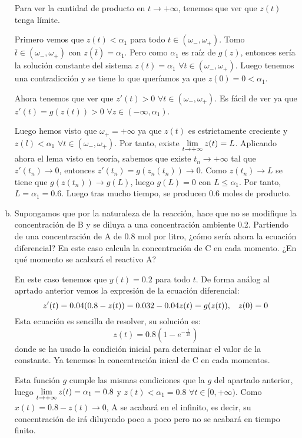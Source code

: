 \documentclass[12pt]{article}
\theoremstyle{definition}
\theoremstyle{remark}
\begin{document}
\begin{enumerate}[(a)]
Para ver la cantidad de producto en $t\longrightarrow+\infty$, tenemos que ver que $z(t)$ tenga límite. 

Primero vemos que $z(t)<\alpha_1$ para todo $t\in(\omega_-,\omega_+)$. Tomo $\bar{t}\in(\omega_-,\omega_+)$ con $z(\bar{t})=\alpha_1$. Pero como $\alpha_1$ es raíz de $g(z)$, entonces sería la solución constante del sistema $z(t)=\alpha_1$ $\forall t\in (\omega_-,\omega_+)$. Luego tenemos una contradicción y se tiene lo que queríamos ya que $z(0)=0<\alpha_1$.

Ahora tenemos que ver que $z'(t)>0$ $\forall t \in (\omega_-,\omega_+)$. Es fácil de ver ya que $z'(t)=g(z(t))>0$ $\forall z \in (-\infty, \alpha_1)$.

Luego hemos visto que $\omega_+=+\infty$ ya que $z(t)$ es estrictamente creciente y $z(l)<\alpha_1$ $\forall t\in(\omega_-,\omega_+)$. Por tanto, existe $\displaystyle\lim_{  t  \to +\infty }  z(t) =L$. Aplicando ahora el lema visto en teoría, sabemos que existe $t_n\longrightarrow +\infty$ tal que $z'(t_n)\longrightarrow 0$, entonces $z'(t_n)=g(z_n(t_n))\longrightarrow 0$. Como $z(t_n)\longrightarrow L$ se tiene que $g(z(t_n))\longrightarrow g(L)$, luego $g(L)=0$ con $L\leq \alpha_1$. Por tanto, $L=\alpha_1=0.6$. Luego tras mucho tiempo, se producen 0.6 moles de producto.
\item Supongamos que por la naturaleza de la reacción, hace que no se modifique la concentración de B y se diluya a una concentración ambiente 0.2. Partiendo de una concentración de A de 0.8 mol por litro, ¿cómo sería ahora la ecuación diferencial? En este caso calcula la concentración de C en cada momento. ¿En qué momento se acabará el reactivo A?

En este caso tenemos que $y(t)=0.2$ para todo $t$. De forma análog al aprtado anterior vemos la expresión de la ecuación diferencial:
\[
z'(t)=0.04(0.8-z(t))=0.032-0.04z(t)=g(z(t)), \;\;\; z(0)=0
\]
Esta ecuación es sencilla de resolver, su solución es:
\[
z(t)=0.8\left(1-e^{-\frac{t}{25}}\right)
\]
donde se ha usado la condición inicial para determinar el valor de la constante. Ya tenemos la concentración inical de C en cada momentos.

Esta función $g$ cumple las mismas condiciones que la $g$ del apartado anterior, luego $\displaystyle\lim_{  t  \to +\infty }  z(t) =\alpha_1=0.8$ y $z(t)<\alpha_1=0.8$ $\forall t\in[0,+\infty)$. Como $x(t)=0.8-z(t)\longrightarrow 0$, A se acabará en el infinito, es decir, su concentración de irá diluyendo poco a poco pero no se acabará en tiempo finito.
\end{enumerate}
\end{document}
